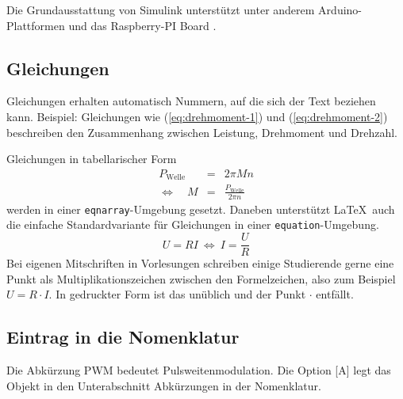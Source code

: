 Die Grundausstattung von Simulink unterstützt unter
anderem Arduino-Plattformen und das Raspberry-PI Board
\citep{mathworks2013}.

   
\subsection{Gleichungen%
            \label{sec:Gleichungen}}

Gleichungen erhalten automatisch Nummern, auf die sich der Text beziehen kann.
Beispiel: Gleichungen wie (\ref{eq:drehmoment-1}) und (\ref{eq:drehmoment-2})
beschreiben den Zusammenhang zwischen Leistung, Drehmoment und Drehzahl.

Gleichungen in tabellarischer Form
\begin{eqnarray}
  P_\text{Welle}         &=& 2  \pi  M  n \label{eq:drehmoment-1} \\
  \Leftrightarrow\quad M &=& \frac{P_\text{Welle}}{ 2  \pi  n} \label{eq:drehmoment-2}
\end{eqnarray}
%
%
werden in einer \lstinline|eqnarray|-Umgebung gesetzt.
Daneben unterstützt \LaTeX\ auch die einfache Standardvariante für
Gleichungen in einer \lstinline|equation|-Umgebung. 
\begin{equation}
  U = R  I ~\Leftrightarrow~ I = \frac{U}{R}
  \label{eq:Ohmsches-Gesetz}
\end{equation}
%
Bei eigenen Mitschriften in Vorlesungen schreiben einige Studierende gerne eine Punkt als Multiplikationszeichen zwischen den Formelzeichen, also zum Beispiel $U=R\cdot I$. 
In gedruckter Form ist das unüblich und der Punkt $\cdot $ entfällt.     
    
    
\subsection{Eintrag in die Nomenklatur%
            \label{sec:Nomenklatur}}

Die Abkürzung PWM  bedeutet Pulsweitenmodulation. 
Die Option [A] legt das Objekt in den Unterabschnitt Abkürzungen in der Nomenklatur.
    
